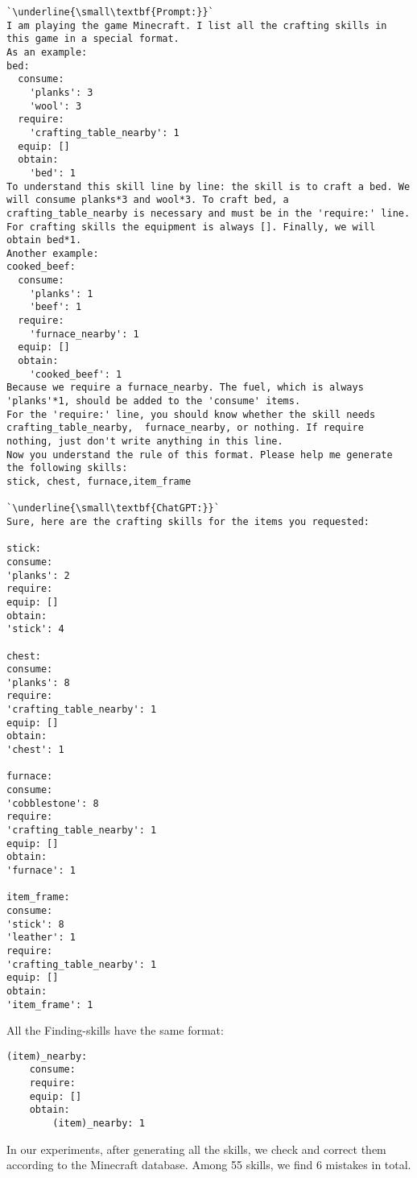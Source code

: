 \documentclass{article}
\begin{document}
\begin{lstlisting}[caption=Prompt for generating some Crafting-skills and ChatGPT's response. We only modify the last querying sentence in the prompt to generate all the skills.]
`\underline{\small\textbf{Prompt:}}` 
I am playing the game Minecraft. I list all the crafting skills in this game in a special format. 
As an example:
bed:
  consume: 
    'planks': 3 
    'wool': 3
  require: 
    'crafting_table_nearby': 1
  equip: []
  obtain: 
    'bed': 1
To understand this skill line by line: the skill is to craft a bed. We will consume planks*3 and wool*3. To craft bed, a crafting_table_nearby is necessary and must be in the 'require:' line.
For crafting skills the equipment is always []. Finally, we will obtain bed*1. 
Another example:
cooked_beef:
  consume:
    'planks': 1
    'beef': 1
  require:
    'furnace_nearby': 1
  equip: []
  obtain:
    'cooked_beef': 1
Because we require a furnace_nearby. The fuel, which is always 'planks'*1, should be added to the 'consume' items.
For the 'require:' line, you should know whether the skill needs crafting_table_nearby,  furnace_nearby, or nothing. If require nothing, just don't write anything in this line.
Now you understand the rule of this format. Please help me generate the following skills:
stick, chest, furnace,item_frame

`\underline{\small\textbf{ChatGPT:}}`
Sure, here are the crafting skills for the items you requested:

stick:
consume:
'planks': 2
require:
equip: []
obtain:
'stick': 4

chest:
consume:
'planks': 8
require:
'crafting_table_nearby': 1
equip: []
obtain:
'chest': 1

furnace:
consume:
'cobblestone': 8
require:
'crafting_table_nearby': 1
equip: []
obtain:
'furnace': 1

item_frame:
consume:
'stick': 8
'leather': 1
require:
'crafting_table_nearby': 1
equip: []
obtain:
'item_frame': 1
\end{lstlisting}

All the Finding-skills have the same format:
\begin{lstlisting}
(item)_nearby:
    consume:
    require:
    equip: []
    obtain:
        (item)_nearby: 1
\end{lstlisting}

In our experiments, after generating all the skills, we check and correct them according to the Minecraft database. Among 55 skills, we find 6 mistakes in total.
\end{document}
